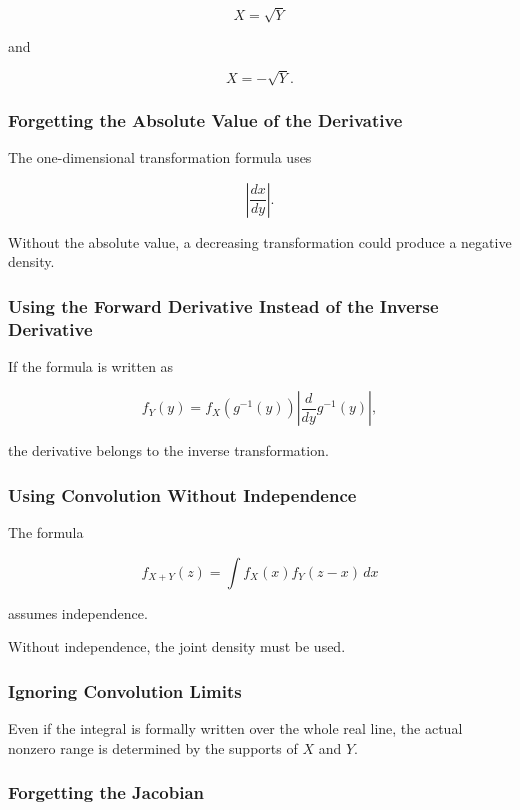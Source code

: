 \[
X=\sqrt{Y}
\]

and

\[
X=-\sqrt{Y}.
\]

\subsubsection{Forgetting the Absolute Value of the Derivative}

The one-dimensional transformation formula uses

\[
\boxed{
\left|
\frac{dx}{dy}
\right|.
}
\]

Without the absolute value, a decreasing transformation could produce a
negative density.

\subsubsection{Using the Forward Derivative Instead of the Inverse Derivative}

If the formula is written as

\[
f_Y(y)
=
f_X(g^{-1}(y))
\left|
\frac{d}{dy}g^{-1}(y)
\right|,
\]

the derivative belongs to the inverse transformation.

\subsubsection{Using Convolution Without Independence}

The formula

\[
f_{X+Y}(z)
=
\int
f_X(x)f_Y(z-x)\,dx
\]

assumes independence.

Without independence, the joint density must be used.

\subsubsection{Ignoring Convolution Limits}

Even if the integral is formally written over the whole real line, the
actual nonzero range is determined by the supports of \(X\) and \(Y\).

\subsubsection{Forgetting the Jacobian}

